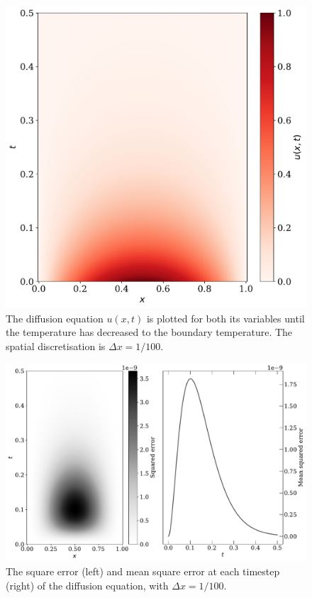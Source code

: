 \documentclass[a4paper, 
amsfonts, 
amssymb, 
amsmath, 
reprint, 
showkeys, 
nofootinbib, 
twoside]{revtex4-2}
\begin{document}
\begin{figure} [h!]
    \centering
    \includegraphics[width=.9\columnwidth]{Figures/num_u100.pdf}
    \caption{The diffusion equation $u(x, t)$ is plotted for both its variables until the temperature has decreased to the boundary temperature. The spatial discretisation is $\Delta x = 1/100$. }
    \label{fig:u100}
\end{figure}

\begin{figure} [h!]
    \centering
    \includegraphics[width = 0.98\columnwidth]{Figures/num_err100.pdf}
    \caption{The square error (left) and mean square error at each timestep (right) of the diffusion equation, with $\Delta x = 1/100$. }
    \label{fig:err100}
\end{figure}
\end{document}
